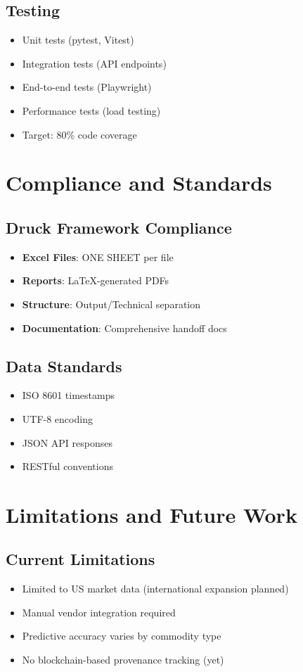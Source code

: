 \documentclass[11pt,a4paper]{article}
\begin{document}
\subsection{Testing}
\begin{itemize}
    \item Unit tests (pytest, Vitest)
    \item Integration tests (API endpoints)
    \item End-to-end tests (Playwright)
    \item Performance tests (load testing)
    \item Target: 80\% code coverage
\end{itemize}

\section{Compliance and Standards}

\subsection{Druck Framework Compliance}
\begin{itemize}
    \item \textbf{Excel Files}: ONE SHEET per file
    \item \textbf{Reports}: LaTeX-generated PDFs
    \item \textbf{Structure}: Output/Technical separation
    \item \textbf{Documentation}: Comprehensive handoff docs
\end{itemize}

\subsection{Data Standards}
\begin{itemize}
    \item ISO 8601 timestamps
    \item UTF-8 encoding
    \item JSON API responses
    \item RESTful conventions
\end{itemize}

\section{Limitations and Future Work}

\subsection{Current Limitations}
\begin{itemize}
    \item Limited to US market data (international expansion planned)
    \item Manual vendor integration required
    \item Predictive accuracy varies by commodity type
    \item No blockchain-based provenance tracking (yet)
\end{itemize}
\end{document}

